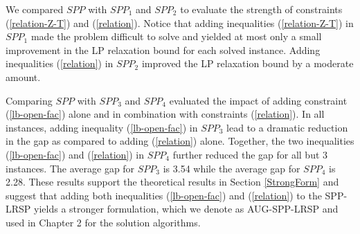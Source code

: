 We compared $SPP$ with $SPP_1$ and $SPP_2$ to evaluate the strength of constraints
(\ref{relation-Z-T}) and (\ref{relation}). Notice that adding inequalities (\ref{relation-Z-T})
in $SPP_1$ made the problem difficult to solve and yielded at most only a small improvement
in the LP relaxation bound for each solved instance.  Adding inequalities (\ref{relation}) in
$SPP_2$ improved the LP relaxation bound by a moderate amount.

Comparing $SPP$ with $SPP_3$ and $SPP_4$ evaluated the impact of adding constraint (\ref{lb-open-fac})
alone and in combination with constraints (\ref{relation}).
In all instances, adding inequality (\ref{lb-open-fac}) in $SPP_3$ lead to a dramatic
reduction in the gap as compared to adding (\ref{relation}) alone.
Together, the two inequalities (\ref{lb-open-fac}) and (\ref{relation}) in $SPP_4$ further reduced the
gap for all but 3 instances.  The average gap for $SPP_3$ is 3.54 while
the average gap for $SPP_4$ is 2.28.
These results support the theoretical results in Section \ref{StrongForm} and suggest that adding
both inequalities (\ref{lb-open-fac}) and (\ref{relation}) to the SPP-LRSP yields a stronger formulation,
which we denote as AUG-SPP-LRSP and used in Chapter 2 for the solution algorithms.
